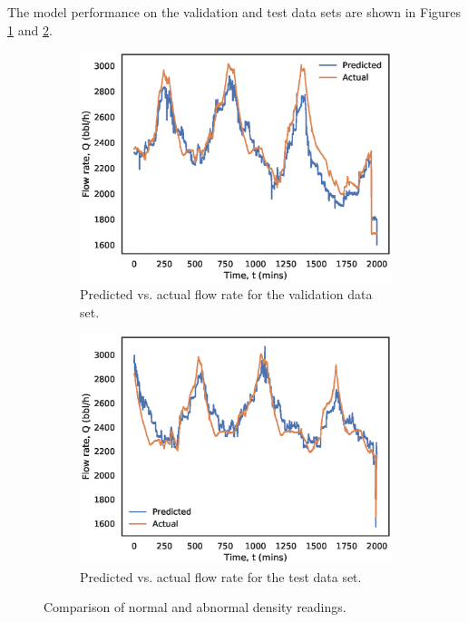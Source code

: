 The model performance on the validation and test data sets are shown in Figures \ref{fig:08LSValidation} and \ref{fig:08LSTest}.
\begin{figure}[h]
     \centering
     \begin{subfigure}[b]{0.48\textwidth}
         \centering
         \includegraphics[width=\textwidth]{images/08ls_validation.eps}
         \caption{Predicted vs. actual flow rate for the validation data set.}
         \label{fig:08LSValidation}
     \end{subfigure}
     \hfill
     \begin{subfigure}[b]{0.48\textwidth}
         \centering
         \includegraphics[width=\textwidth]{images/08ls_test.eps}
         \caption{Predicted vs. actual flow rate for the test data set.}
         \label{fig:08LSTest}
     \end{subfigure}
        \caption{Comparison of normal and abnormal density readings.}
        \label{fig:08LSPlots}
\end{figure}

